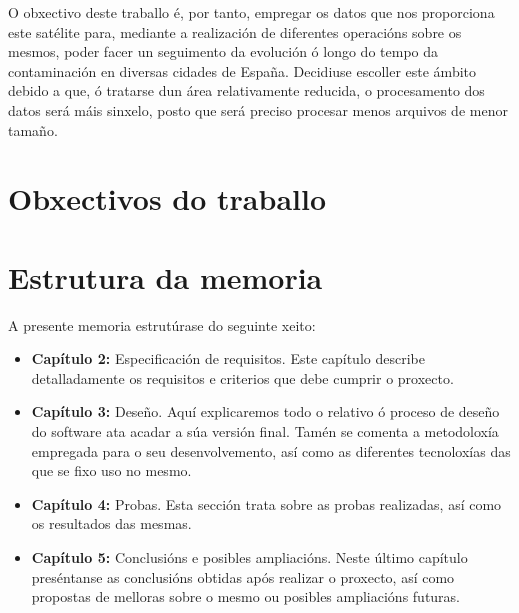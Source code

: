 O obxectivo deste traballo é, por tanto, empregar os datos que nos proporciona este satélite para, mediante a realización de diferentes operacións sobre
os mesmos, poder facer un seguimento da evolución ó longo do tempo da contaminación en diversas cidades de España. Decidiuse escoller este ámbito debido
a que, ó tratarse dun área relativamente reducida, o procesamento dos datos será máis sinxelo, posto que será preciso procesar menos arquivos de menor tamaño.


\section{Obxectivos do traballo}

\section{Estrutura da memoria}
A presente memoria estrutúrase do seguinte xeito:
\begin{itemize}
    \item \textbf{Capítulo 2:} Especificación de requisitos. Este capítulo describe detalladamente os requisitos e criterios que debe cumprir o proxecto.
    \item \textbf{Capítulo 3:} Deseño. Aquí explicaremos todo o relativo ó proceso de deseño do software ata acadar a súa versión final. Tamén se comenta a
    metodoloxía empregada para o seu desenvolvemento, así como as diferentes tecnoloxías das que se fixo uso no mesmo.
    \item \textbf{Capítulo 4:} Probas. Esta sección trata sobre as probas realizadas, así como os resultados das mesmas.
    \item \textbf{Capítulo 5:} Conclusións e posibles ampliacións. Neste último capítulo preséntanse as conclusións obtidas após realizar o proxecto,
    así como propostas de melloras sobre o mesmo ou posibles ampliacións futuras.
\end{itemize}
